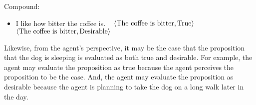 \begin{note}
  Compound:
  \begin{itemize}
  \item I like how bitter the coffee is.\newline
    \mbox{ }\hfill%
    \(\langle \text{The coffee is bitter}, \text{True} \rangle\)\newline
    \mbox{ }\hfill%
    \(\langle \text{The coffee is bitter}, \text{Desirable} \rangle\)
  \end{itemize}

  Likewise, from the agent's perspective, it may be the case that the proposition that the dog is sleeping is evaluated as both true and desirable.
  For example, the agent may evaluate the proposition as true because the agent perceives the proposition to be the case.
  And, the agent may evaluate the proposition as desirable because the agent is planning to take the dog on a long walk later in the day.
\end{note}

